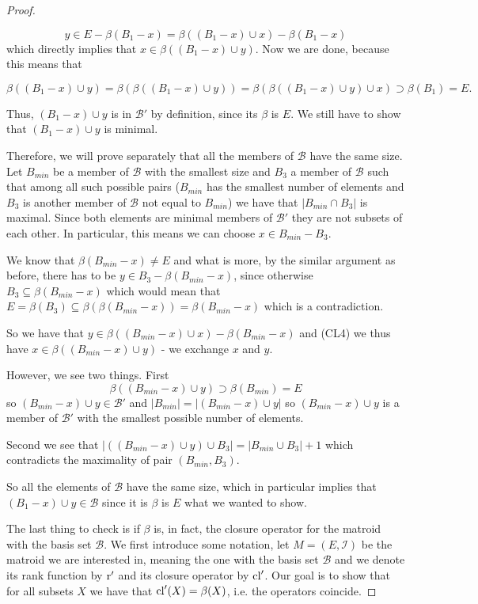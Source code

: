 \begin{proof}
\begin{enumerate}
    $$y \in E - \beta(B_1 - x) = \beta((B_1 -x )\cup x)-\beta(B_1 - x)$$ which directly implies that $x \in \beta((B_1 - x)\cup y)$. Now we are done, because this means that 
    
    $$\beta((B_1-x)\cup y) = \beta(\beta((B_1-x )\cup y)) = \beta(\beta((B_1 - x)\cup y)\cup x) \supset \beta(B_1) = E.$$
    
    
    Thus, $(B_1 - x) \cup y$ is in $\mathcal{B}'$ by definition, since its $\beta$ is $E$. We still have to show that $(B_1 - x)\cup y$ is minimal.
    
    Therefore, we will prove separately that all the members of $\mathcal{B}$ have the same size. Let $B_{min}$ be a member of $\mathcal{B}$ with the smallest size and $B_3$ a member of $\mathcal{B}$ such that among all such possible pairs ($B_{min}$ has the smallest number of elements and $B_3$ is another member of $\mathcal{B}$ not equal to $B_{min}$) we have that $|B_{min} \cap B_3|$ is maximal. Since both elements are minimal members of $\mathcal{B}'$ they are not subsets of each other. In particular, this means we can choose $x \in B_{min} - B_3$. 
    
    We know that $\beta(B_{min}-x) \neq E$ and what is more, by the similar argument as before, there has to be $y \in B_3 - \beta(B_{min} - x)$, since otherwise $B_3 \subseteq \beta(B_{min} - x)$ which would mean that $E = \beta(B_3)\subseteq \beta(\beta(B_{min}-x)) = \beta(B_{min} - x)$ which is a contradiction. 
    
    So we have that $y \in \beta((B_{min}-x)\cup x) - \beta(B_{min} -x)$ and (CL4) we thus have $x \in \beta((B_{min}-x)\cup y)$ - we exchange $x$ and $y$. 
    
    However, we see two things. First
    $$\beta((B_{min} - x) \cup y) \supset \beta(B_{min}) = E$$ so $(B_{min} - x) \cup y \in \mathcal{B}'$ and $|B_{min}|  = |(B_{min} - x)\cup y|$ so $(B_{min} - x)\cup y$ is a member of $\mathcal{B}'$ with the smallest possible number of elements. 
    
    Second we see that $|((B_{min}-x)\cup y) \cup B_3| = |B_{min}\cup B_3|+1$ which contradicts the maximality of pair $(B_{min} ,B_3)$. 
    
    So all the elements of $\mathcal{B}$ have the same size, which in  particular implies that $(B_1 - x) \cup y \in \mathcal{B}$ since it is $\beta$  is $E$ what we wanted to show.
    

\end{enumerate}


The last thing to check is if $\beta$ is, in fact, the closure operator for the matroid with the basis set $\mathcal{B}.$ We first introduce some notation, let $M = (E, \mathcal{I})$ be the matroid we are interested in, meaning the one with the basis set $\mathcal{B}$ and we denote its rank function by $\operatorname{r}'$ and its closure operator by $\mathrm{cl}'$. Our goal is to show that for all subsets $X$ we have that $\mathrm{cl}'(X) = \beta(X)$, i.e. the operators coincide.


\end{proof}
